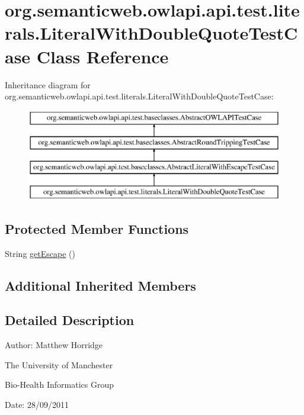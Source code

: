 \hypertarget{classorg_1_1semanticweb_1_1owlapi_1_1api_1_1test_1_1literals_1_1_literal_with_double_quote_test_case}{\section{org.\-semanticweb.\-owlapi.\-api.\-test.\-literals.\-Literal\-With\-Double\-Quote\-Test\-Case Class Reference}
\label{classorg_1_1semanticweb_1_1owlapi_1_1api_1_1test_1_1literals_1_1_literal_with_double_quote_test_case}
}
Inheritance diagram for org.\-semanticweb.\-owlapi.\-api.\-test.\-literals.\-Literal\-With\-Double\-Quote\-Test\-Case\-:\begin{figure}[H]
\begin{center}
\leavevmode
\includegraphics[height=4.000000cm]{classorg_1_1semanticweb_1_1owlapi_1_1api_1_1test_1_1literals_1_1_literal_with_double_quote_test_case}
\end{center}
\end{figure}
\subsection*{Protected Member Functions}
\begin{DoxyCompactItemize}
\item 
String \hyperlink{classorg_1_1semanticweb_1_1owlapi_1_1api_1_1test_1_1literals_1_1_literal_with_double_quote_test_case_a6ba6b2ef68ba1360156536fb22f94633}{get\-Escape} ()
\end{DoxyCompactItemize}
\subsection*{Additional Inherited Members}


\subsection{Detailed Description}
Author\-: Matthew Horridge\par
 The University of Manchester\par
 Bio-\/\-Health Informatics Group\par
 Date\-: 28/09/2011 

